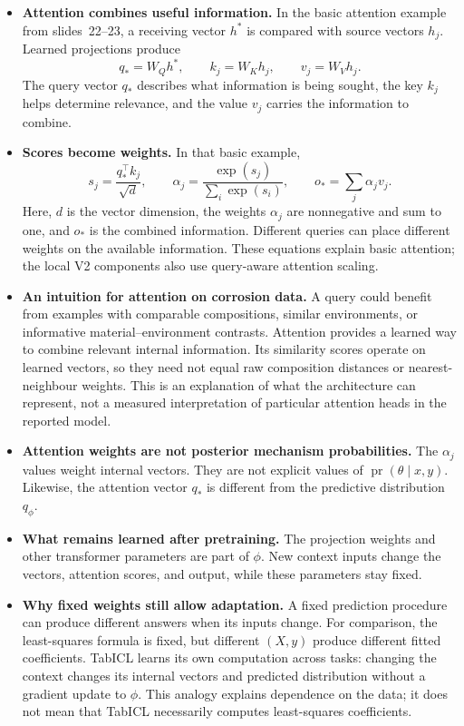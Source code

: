 \documentclass[11pt]{article}
\newcommand{\pr}{\operatorname{pr}}
\newenvironment{notes}
  {\begin{itemize}\setlength{\itemsep}{0.45em}\setlength{\parsep}{0pt}}
  {\end{itemize}}
\begin{document}
\begin{notes}
    \item \textbf{Attention combines useful information.}
    In the basic attention example from slides~22--23, a receiving
    vector \(h^\ast\) is compared with source vectors \(h_j\).
    Learned projections produce
    \[
        q_\ast=W_Qh^\ast,\qquad
        k_j=W_Kh_j,\qquad
        v_j=W_Vh_j.
    \]
    The query vector \(q_\ast\) describes what information is
    being sought, the key \(k_j\) helps determine relevance, and
    the value \(v_j\) carries the information to combine.

    \item \textbf{Scores become weights.} In that basic example,
    \[
        s_j=\frac{q_\ast^\top k_j}{\sqrt{d}},
        \qquad
        \alpha_j=\frac{\exp(s_j)}{\sum_i\exp(s_i)},
        \qquad
        o_\ast=\sum_j\alpha_jv_j.
    \]
    Here, \(d\) is the vector dimension, the weights
    \(\alpha_j\) are nonnegative and sum to one, and \(o_\ast\)
    is the combined information. Different queries can place
    different weights on the available information. These
    equations explain basic attention; the local V2 components
    also use query-aware attention scaling.

    \item \textbf{An intuition for attention on corrosion data.}
    A query could benefit from examples with comparable compositions,
    similar environments, or informative material--environment
    contrasts. Attention provides a learned way to combine relevant
    internal information. Its similarity scores operate on learned
    vectors, so they need not equal raw composition distances or
    nearest-neighbour weights. This is an explanation of what the
    architecture can represent, not a measured interpretation of
    particular attention heads in the reported model.

    \item \textbf{Attention weights are not posterior mechanism
    probabilities.} The \(\alpha_j\) values weight internal
    vectors. They are not explicit values of
    \(\pr(\theta\mid x,y)\). Likewise, the attention vector
    \(q_\ast\) is different from the predictive distribution
    \(q_\phi\).

    \item \textbf{What remains learned after pretraining.}
    The projection weights and other transformer parameters are
    part of \(\phi\). New context inputs change the vectors,
    attention scores, and output, while these parameters stay
    fixed.

    \item \textbf{Why fixed weights still allow adaptation.}
    A fixed prediction procedure can produce different answers
    when its inputs change. For comparison, the least-squares
    formula is fixed, but different \((X,y)\) produce different
    fitted coefficients. TabICL learns its own computation across
    tasks: changing the context changes its internal vectors and
    predicted distribution without a gradient update to \(\phi\).
    This analogy explains dependence on the data; it does not mean
    that TabICL necessarily computes least-squares coefficients.
\end{notes}
\end{document}
